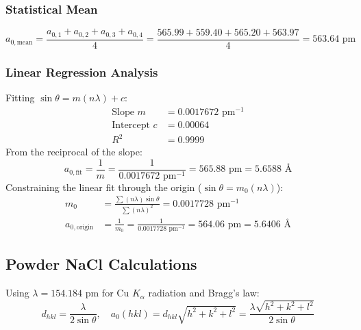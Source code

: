 \documentclass[12pt,a4paper]{article}
\begin{document}
\subsubsection{Statistical Mean}
\begin{equation}
    a_{0,\text{mean}} = \frac{a_{0,1} + a_{0,2} + a_{0,3} + a_{0,4}}{4} = \frac{565.99 + 559.40 + 565.20 + 563.97}{4} = 563.64\text{ pm}
\end{equation}

\subsubsection{Linear Regression Analysis}
Fitting $\sin\theta = m (n\lambda) + c$:
\begin{align}
    \text{Slope } m &= 0.0017672\text{ pm}^{-1} \\
    \text{Intercept } c &= 0.00064 \\
    R^2 &= 0.9999
\end{align}
From the reciprocal of the slope:
\begin{equation}
    a_{0,\text{fit}} = \frac{1}{m} = \frac{1}{0.0017672\text{ pm}^{-1}} = 565.88\text{ pm} = 5.6588\text{ \AA}
\end{equation}
Constraining the linear fit through the origin ($\sin\theta = m_0 (n\lambda)$):
\begin{align}
    m_0 &= \frac{\sum (n\lambda) \sin\theta}{\sum (n\lambda)^2} = 0.0017728\text{ pm}^{-1} \\
    a_{0,\text{origin}} &= \frac{1}{m_0} = \frac{1}{0.0017728\text{ pm}^{-1}} = 564.06\text{ pm} = 5.6406\text{ \AA}
\end{align}

\subsection{Powder NaCl Calculations}
Using $\lambda = 154.184\text{ pm}$ for $\text{Cu } K_\alpha$ radiation and Bragg's law:
\begin{equation}
    d_{hkl} = \frac{\lambda}{2\sin\theta}, \quad a_0(hkl) = d_{hkl} \sqrt{h^2 + k^2 + l^2} = \frac{\lambda \sqrt{h^2 + k^2 + l^2}}{2\sin\theta}
\end{equation}
\end{document}
